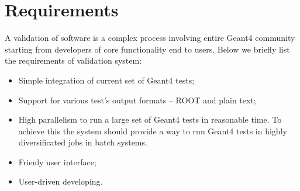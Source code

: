\section{Requirements}
\label{sec:requirements}

A validation of software is a complex process involving entire Geant4 community starting from developers of core functionality end to users. Below we briefly list the requirements of validation system:

\begin{itemize}
    \item Simple integration of current set of Geant4 tests;
    \item Support for various test's output formats -- ROOT and plain text;
    \item High parallelism to run a large set of Geant4 tests in reasonable time. To achieve this the system should provide a way to run Geant4 tests in highly diversificated jobs in batch systems.
    \item Frienly user interface;
    \item User-driven developing.
\end{itemize}